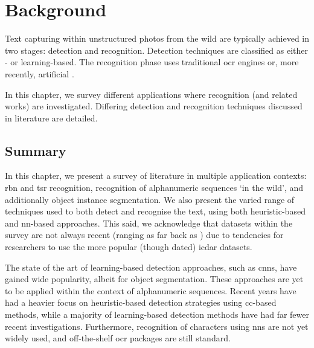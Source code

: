 \chapter{Background}
\label{ch:background}


Text capturing within unstructured photos from the wild are typically achieved in two stages: detection and recognition. Detection techniques are classified as either - or learning-based. The recognition phase uses traditional \gls{ocr} engines or, more recently, artificial . 

In this chapter, we survey different applications where  recognition (and related works) are investigated. Differing detection and recognition techniques discussed in literature are detailed.





\newpage
\section{Summary}

In this chapter, we present a survey of literature in multiple application contexts: \gls{rbn} and \gls{tsr} recognition, recognition of alphanumeric sequences `in the wild', and additionally object instance segmentation. We also present the varied range of techniques used to both detect and recognise the text, using both heuristic-based and \gls{nn}-based approaches. This said, we acknowledge that datasets within the survey are not always recent (ranging as far back as \citeyear{Lucas:2003iw}) due to tendencies for researchers to use the more popular (though dated) \gls{icdar} datasets.

The state of the art of learning-based detection approaches, such as \glspl{cnn}, have gained wide popularity, albeit for object segmentation. These approaches are yet to be applied within the context of alphanumeric sequences. Recent years have had a heavier focus on heuristic-based detection strategies using \gls{cc}-based methods, while a majority of learning-based detection methods have had far fewer recent investigations. Furthermore, recognition of characters using \glspl{nn} are not yet widely used, and off-the-shelf \gls{ocr} packages are still standard.